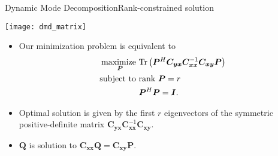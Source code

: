\begin{frame}[t, c]{Dynamic Mode Decomposition}{Rank-constrained solution}
  \begin{minipage}{.28\textwidth}
    \centering
    \texttt{[image: dmd\_matrix]}
  \end{minipage}%
  \hfill
  \begin{minipage}{.68\textwidth}
    \begin{itemize}
    \item Our minimization problem is equivalent to
      \[
        \begin{aligned}
          \operatorname*{maximize~}_{\bm{P}} & \text{Tr}\left( \bm{P}^H \bm{C}_{\bm{yx}} \bm{C}_{\bm{xx}}^{-1} \bm{C}_{\bm{xy}} \bm{P} \right) \\
          \operatorname*{subject~to~} & \text{rank } \bm{P} = r \\
          & \bm{P}^H \bm{P} = \bm{I}.
        \end{aligned}
      \]
      
      \medskip
      
    \item Optimal solution is given by the first \( r \) eigenvectors of the symmetric positive-definite matrix \( \bm{C}_{\bm{yx}} \bm{C}_{\bm{xx}}^{-1} \bm{C}_{\bm{xy}} \).
      
      \medskip
      
    \item \( \bm{Q} \) is solution to \( \bm{C}_{\bm{xx}} \bm{Q} =  \bm{C}_{\bm{xy}} \bm{P} \).
    \end{itemize}
  \end{minipage}
  
  \vspace{1cm}
\end{frame}


